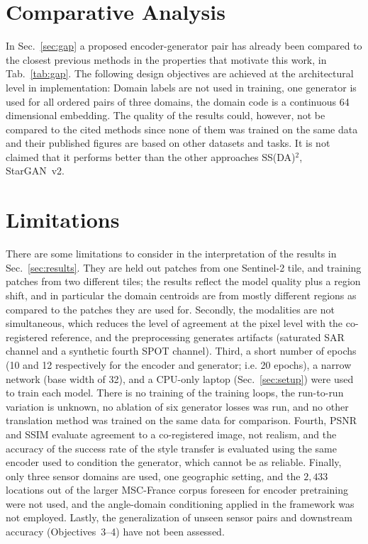 \documentclass[runningheads]{llncs}
\begin{document}
\section{Comparative Analysis}
In Sec.~\ref{sec:gap} a proposed encoder-generator pair has already been compared to the closest previous methods in the properties that motivate this work, in Tab.~\ref{tab:gap}. The following design objectives are achieved at the architectural level in implementation: Domain labels are not used in training, one generator is used for all ordered pairs of three domains, the domain code is a continuous 64 dimensional embedding. The quality of the results could, however, not be compared to the cited methods since none of them was trained on the same data and their published figures are based on other datasets and tasks. It is not claimed that it performs better than the other approaches SS(DA)$^2$, StarGAN~v2.

\section{Limitations}
\label{sec:limitations}
There are some limitations to consider in the interpretation of the results in Sec.~\ref{sec:results}. They are held out patches from one Sentinel-2 tile, and training patches from two different tiles; the results reflect the model quality plus a region shift, and in particular the domain centroids are from mostly different regions as compared to the patches they are used for. Secondly, the modalities are not simultaneous, which reduces the level of agreement at the pixel level with the co-registered reference, and the preprocessing generates artifacts (saturated SAR channel and a synthetic fourth SPOT channel). Third, a short number of epochs (10 and 12 respectively for the encoder and generator; i.e. 20 epochs), a narrow network (base width of 32), and a CPU-only laptop (Sec.~\ref{sec:setup}) were used to train each model. There is no training of the training loops, the run-to-run variation is unknown, no ablation of six generator losses was run, and no other translation method was trained on the same data for comparison. Fourth, PSNR and SSIM evaluate agreement to a co-registered image, not realism, and the accuracy of the success rate of the style transfer is evaluated using the same encoder used to condition the generator, which cannot be as reliable. Finally, only three sensor domains are used, one geographic setting, and the $2{,}433$ locations out of the larger MSC-France corpus foreseen for encoder pretraining were not used, and the angle-domain conditioning applied in the framework was not employed. Lastly, the generalization of unseen sensor pairs and downstream accuracy (Objectives~3--4) have not been assessed.
\end{document}
